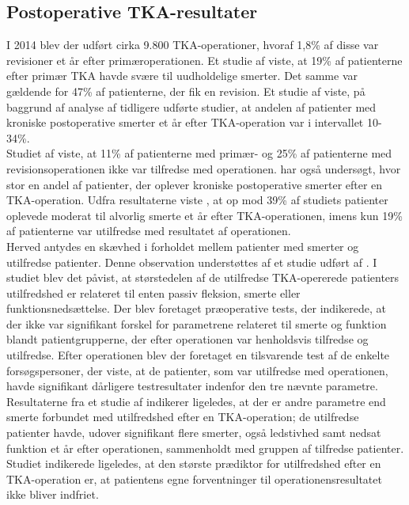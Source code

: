\subsection{Postoperative TKA-resultater}
I 2014 blev der udført cirka 9.800 TKA-operationer, hvoraf 1,8\% af disse var revisioner et år efter primæroperationen. \citep{aarsrapport2016} Et studie af  viste, at 19\% af patienterne efter primær TKA havde svære til uudholdelige smerter. Det samme var gældende for 47\% af patienterne, der fik en revision. Et studie af  viste, på baggrund af analyse af tidligere udførte studier, at andelen af patienter med kroniske postoperative smerter et år efter TKA-operation var i intervallet 10-34\%.\\
Studiet af  viste, at 11\% af patienterne med primær- og 25\% af patienterne med revisionsoperationen ikke var tilfredse med operationen. \citep{Petersen2015}
 har også undersøgt, hvor stor en andel af patienter, der oplever kroniske postoperative smerter efter en TKA-operation. Udfra resultaterne viste , at op mod 39\% af studiets patienter oplevede moderat til alvorlig smerte et år efter TKA-operationen, imens kun 19\% af patienterne var utilfredse med resultatet af operationen.\\
Herved antydes en skævhed i forholdet mellem patienter med smerter og utilfredse patienter. Denne observation understøttes af et studie udført af . I studiet blev det påvist, at størstedelen af de utilfredse TKA-opererede patienters utilfredshed er relateret til enten passiv fleksion, smerte eller funktionsnedsættelse. Der blev foretaget præoperative tests, der indikerede, at der ikke var signifikant forskel for parametrene relateret til smerte og funktion blandt patientgrupperne, der efter operationen var henholdsvis tilfredse og utilfredse. Efter operationen blev der foretaget en tilsvarende test af de enkelte forsøgspersoner, der viste, at de patienter, som var utilfredse med operationen, havde signifikant dårligere testresultater indenfor den tre nævnte parametre.  
Resultaterne fra et studie af  indikerer ligeledes, at der er andre parametre end smerte forbundet med utilfredshed efter en TKA-operation; de utilfredse patienter havde, udover signifikant flere smerter, også ledstivhed samt nedsat funktion et år efter operationen, sammenholdt med gruppen af tilfredse patienter. Studiet indikerede ligeledes, at den største prædiktor for utilfredshed efter en TKA-operation er, at patientens egne forventninger til operationensresultatet ikke bliver indfriet. 



